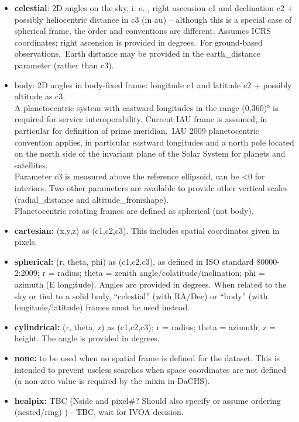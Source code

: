 \documentclass[11pt,a4paper]{ivoa}
\begin{document}
\begin{itemize}
\item \textbf{celestial}: 2D angles on the sky, i. e. , right ascension c1 and declination c2 + possibly heliocentric distance in c3 (in au) – although this is a special case of spherical frame, the order and conventions are different. Assumes ICRS coordinates; right ascension is provided in degrees. For ground-based observations, Earth distance may be provided in the earth\_distance parameter (rather than c3). 
\item body: 2D angles in body-fixed frame: longitude c1 and latitude c2 + possibly altitude as c3. \\A planetocentric system with eastward longitudes in the range (0,360)° is required for service interoperability. Current IAU frame is assumed, in particular for definition of prime meridian. IAU 2009 planetocentric convention applies, in particular eastward longitudes and a north pole located on the north side of the invariant plane of the Solar System for planets and satellites.  \\Parameter c3 is measured above the reference ellipsoid, can be <0 for interiors. Two other parameters are available to provide other vertical scales (radial\_distance and altitude\_fromshape). \\Planetocentric rotating frames are defined as spherical (not body).
\item \textbf{cartesian:} (x,y,z) as (c1,c2,c3). This includes spatial coordinates given in pixels.
\item \textbf{spherical:} (r, theta, phi) as (c1,c2,c3), as defined in ISO standard 80000-2:2009; r = radius; theta = zenith angle/colatitude/inclination; phi = azimuth (E longitude). Angles are provided in degrees. When related to the sky or tied to a solid body, ``celestial'' (with RA/Dec) or ``body'' (with longitude/latitude) frames must be used instead.
\item \textbf{cylindrical:} (r, theta, z) as (c1,c2,c3); r = radius; theta = azimuth; z = height. The angle is provided in degrees.
\item \textbf{none:} to be used when no spatial frame is defined for the dataset. This is intended to prevent useless searches when space coordinates are not defined (a non-zero value is required by the mixin in DaCHS).
\item \textbf{healpix:} TBC (Nside and pixel\#? Should also specify or assume ordering (nested/ring) ) - TBC, wait for IVOA decision.
\end{itemize}
\end{document}
